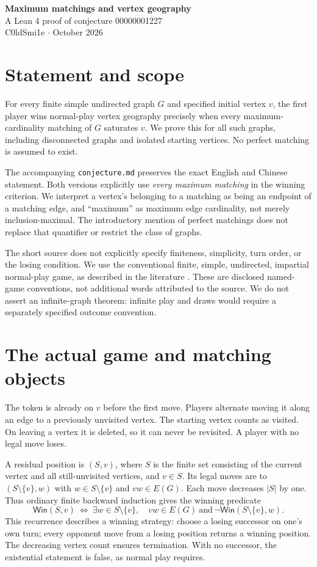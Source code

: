 \documentclass[10pt,letterpaper]{article}
\newcommand{\Win}{\mathsf{Win}}
\newcommand{\code}[1]{\texttt{\small #1}}
\begin{document}
\begin{center}
{\LARGE\bfseries Maximum matchings and vertex geography}\\[7pt]
{\large A Lean 4 proof of conjecture 00000001227}\\[6pt]
C0ldSmi1e \quad $\cdot$  October 2026
\end{center}

\section*{Statement and scope}
For every finite simple undirected graph $G$ and specified initial vertex $v$,
the first player wins normal-play vertex geography precisely when every
maximum-cardinality matching of $G$ saturates $v$. We prove this for all such
graphs, including disconnected graphs and isolated starting vertices.
No perfect matching is assumed to exist.

The accompanying \code{conjecture.md} preserves the exact English and Chinese
statement. Both versions explicitly use \emph{every maximum matching} in the
winning criterion. We interpret a vertex's belonging to a matching as being an
endpoint of a matching edge, and ``maximum'' as maximum edge cardinality,
not merely inclusion-maximal. The introductory mention of perfect matchings
does not replace that quantifier or restrict the class of graphs.

The short source does not explicitly specify finiteness, simplicity, turn order,
or the losing condition. We use the conventional finite, simple, undirected,
impartial normal-play game, as described in the literature
\cite{fox,gates}. These are disclosed named-game conventions, not additional
words attributed to the source. We do not assert an infinite-graph theorem:
infinite play and draws would require a separately specified outcome convention.

\section*{The actual game and matching objects}
The token is already on $v$ before the first move. Players alternate moving it
along an edge to a previously unvisited vertex. The starting vertex counts as
visited. On leaving a vertex it is deleted, so it can never be revisited.
A player with no legal move loses.

A residual position is $(S,v)$, where $S$ is the finite set consisting of the
current vertex and all still-unvisited vertices, and $v\in S$. Its legal moves
are to $(S\setminus\{v\},w)$ with $w\in S\setminus\{v\}$ and $vw\in E(G)$.
Each move decreases $|S|$ by one. Thus ordinary finite backward induction gives
the winning predicate
\[
 \Win(S,v)\ \Longleftrightarrow\
 \exists w\in S\setminus\{v\},\quad vw\in E(G)
 \ \text{and}\ \neg\Win(S\setminus\{v\},w).
\]
This recurrence describes a winning strategy: choose a losing successor on
one's own turn; every opponent move from a losing position returns a winning
position. The decreasing vertex count ensures termination. With no successor,
the existential statement is false, as normal play requires.
\end{document}
